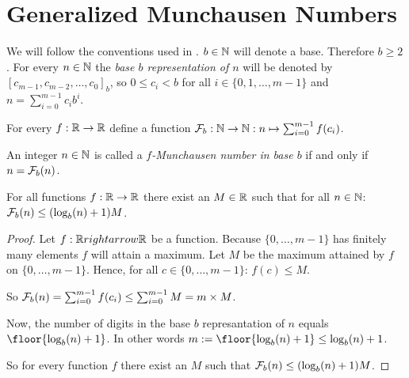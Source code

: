 \section*{Generalized Munchausen Numbers}

We will follow the conventions used in \cite{dvb}. $b\in\mathbb{N}$ will denote a base.
Therefore $b \ge 2$. For every $n \in \mathbb{N}$ the \emph{base $b$ representation
of $n$} will be denoted by $[c_{m-1}, c_{m-2}, \ldots, c_{0}]_{b}$, so 
$0 \le c_{i} < b$ for all $i \in \{0,1,\ldots,m-1\}$ and 
$n = \sum_{i=0}^{m-1} c_{i}b^{i}$.

For every $f : \mathbb{R} \rightarrow \mathbb{R}$ define a function $\mathcal{F}_{b} : \mathbb{N} \rightarrow
\mathbb{N} : n \mapsto \sum_{i=0}^{m-1} f(c_{i})$.

\begin{definition}
	An integer $n \in \mathbb{N}$ is called a \emph{$f$-Munchausen number in base $b$}
	if and only if $n = \mathcal{F}_{b}(n)$.
\end{definition}


\begin{lemma}
	For all functions $f : \mathbb{R} \rightarrow \mathbb{R}$ there exist an 
	$M \in \mathbb{R}$ such that for all $n \in \mathbb{N}$: $\mathcal{F}_{b}(n) \le (\log_{b}(n) + 1) M$.
\end{lemma}

\begin{proof}
	Let $f : \mathbb{R} rightarrow \mathbb{R}$ be a function. Because $\{0,\ldots,m-1\}$ has 
	finitely many elements $f$ will attain a maximum. Let $M$ be the maximum
	attained by $f$ on $\{0,\ldots,m-1\}$. Hence, for all 
	$c \in \{0,\ldots,m-1\}$: $f(c) \le M$.
	
	So $\mathcal{F}_{b}(n) = \sum_{i=0}^{m-1} f(c_{i}) \le 
	\sum_{i=0}^{m-1} M = m \times M$.
	
	Now, the number of digits in the base $b$ represantation of $n$ equals 
	$\floor{\blog(n) + 1}$. In other words $m := \floor{\blog(n) + 1} 
	\le \blog(n) + 1$.
	
	So for every function $f$ there exist an $M$ such that 
	$\mathcal{F}_{b}(n) \le (\log_{b}(n) + 1) M$.
\end{proof}

